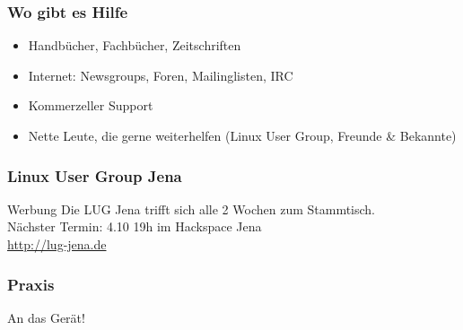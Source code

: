 \documentclass[compress]{beamer}
\begin{document}
\begin{frame}
	\frametitle{Wo gibt es Hilfe}
	\begin{block}{}
		\begin{itemize}
			\item Handbücher, Fachbücher, Zeitschriften
			\item Internet: Newsgroups, Foren, Mailinglisten, IRC
			\item Kommerzeller Support
			\item Nette Leute, die gerne weiterhelfen (Linux User Group, 
				Freunde \& Bekannte)
		\end{itemize}
	\end{block}
\end{frame}

\begin{frame}
	\frametitle{Linux User Group Jena}
	\begin{block}{Werbung}
		Die LUG Jena trifft sich alle 2 Wochen zum Stammtisch.\\
		Nächster Termin: 4.10 19h im Hackspace Jena \\
		\url{http://lug-jena.de}
	\end{block}
\end{frame}

\begin{frame}
	\frametitle{Praxis}
	\center{}	\Huge{An das Gerät!}
\end{frame}
\end{document}

